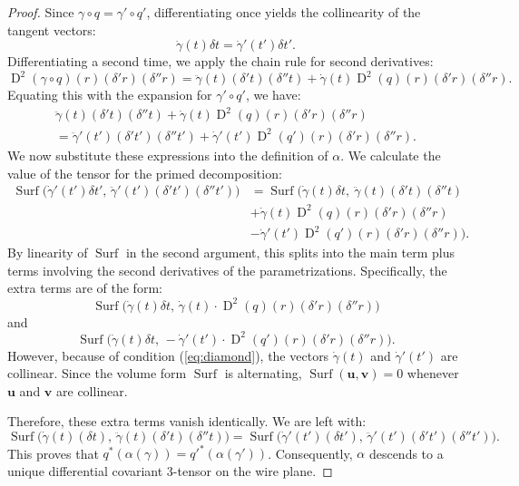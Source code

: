 \documentclass[10pt,letterpaper,reqno]{amsart}
\DeclareMathOperator{\D}{D} %
\DeclareMathOperator{\surf}{Surf}
\begin{document}
\begin{proof}
    Since $\gamma \circ q = \gamma' \circ q'$,
    differentiating once yields the collinearity of the tangent vectors:
    \begin{equation} \tag{$\diamondsuit$}
      \label{eq:diamond}
      \dot\gamma(t) \delta t = \dot\gamma'(t') \delta t'.
    \end{equation}
    Differentiating a second time,
    we apply the chain rule for second derivatives:
    $$
      \D^2(\gamma \circ q)(r)(\delta'r)(\delta''r) =
      \ddot\gamma(t)(\delta't)(\delta''t) + \dot\gamma(t) \D^2(q)(r)(\delta'r)(\delta''r).
      $$
    Equating this with the expansion for $\gamma' \circ q'$,
    we have:
    \begin{multline*}
      \ddot\gamma(t)(\delta't)(\delta''t) + \dot\gamma(t) \D^2(q)(r)(\delta'r)(\delta''r) \\
      =
      \ddot\gamma'(t') (\delta't')(\delta''t') + \dot\gamma'(t') \D^2(q')(r)(\delta'r)(\delta''r).
    \end{multline*}
    We now substitute these expressions into the definition of $\alpha$.
    We calculate the value of the tensor for the primed decomposition:
    \begin{align*}
      \surf\big(\dot\gamma'(t')\delta t', \, \ddot\gamma'(t')(\delta't')(\delta''t')\big)
      & =
      \surf\bigg(
      \dot\gamma(t)\delta t, \
      \ddot\gamma(t)(\delta't)(\delta''t) \\
      &  + \dot\gamma(t) \D^2(q)(r)(\delta'r)(\delta''r) \\
      &  - \dot\gamma'(t') \D^2(q')(r)(\delta'r)(\delta''r)
      \bigg).
    \end{align*}
    By linearity of $\surf$ in the second argument,
    this splits into the main term plus terms involving the second derivatives of the parametrizations.
    Specifically, the extra terms are of the form:
    $$
      \surf\big(\dot\gamma(t)\delta t, \, \dot\gamma(t) \cdot \D^2(q)(r)(\delta'r)(\delta''r) \big)
      $$
    and
    $$
      \surf\big(\dot\gamma(t)\delta t, \, -\dot\gamma'(t') \cdot \D^2(q')(r)(\delta'r)(\delta''r) \big).
      $$
    However,
    because of condition (\ref{eq:diamond}),
    the vectors $\dot\gamma(t)$ and $\dot\gamma'(t')$ are collinear.
    Since the volume form $\surf$ is alternating,
    $\surf(\mathbf{u}, \mathbf{v}) = 0$ whenever $\mathbf{u}$ and $\mathbf{v}$ are collinear.
    
    Therefore,
    these extra terms vanish identically.
    We are left with:
    $$
      \surf\big(\dot\gamma(t)(\delta t), \, \ddot\gamma(t)(\delta't)(\delta''t)\big) =
      \surf\big(\dot\gamma'(t')(\delta t'), \, \ddot\gamma'(t')(\delta't')(\delta''t')\big).
      $$
    This proves that $q^*(\alpha(\gamma)) = q'^*(\alpha(\gamma'))$.
    Consequently,
    $\alpha$ descends to a unique differential covariant 3-tensor on the wire plane.
  \end{proof}
  
\end{document}
